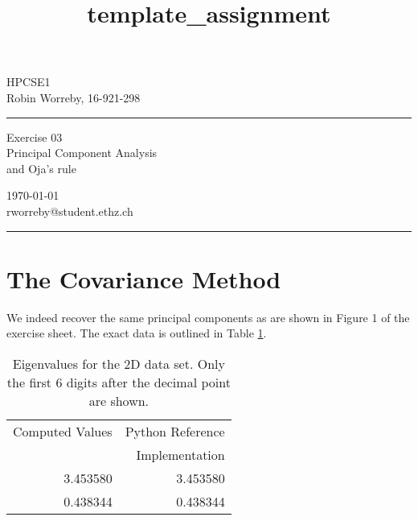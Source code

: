 \documentclass[a4paper,10pt]{article} %
\begin{document}

\title{template_assignment} %
\fancyhead[C]{}
\begin{minipage}{0.295\textwidth} %
\raggedright
HPCSE1\\ %
\footnotesize %
Robin Worreby, 16-921-298 %
\medskip\hrule
\end{minipage}
\begin{minipage}{0.4\textwidth} %
\centering 
\large %
Exercise 03\\ %
\normalsize %
Principal Component Analysis\\ and Oja’s rule\\ %
\end{minipage}
\begin{minipage}{0.295\textwidth} %
\raggedleft
\today\\ %
\footnotesize %
rworreby@student.ethz.ch%
\medskip\hrule
\end{minipage}


\setcounter{section}{0}

\section{The Covariance Method}
We indeed recover the same principal components as are shown in Figure 1 of the exercise sheet. The exact data is outlined in Table \ref{table:eigenvalues}.

\begin{table}[h!]
 \centering
{\begin{tabular}{r r}
    \toprule
    Computed Values & Python Reference \\
    & Implementation \\
    \midrule
    3.453580 & 3.453580 \\
    0.438344 & 0.438344 \\
    \bottomrule
\end{tabular}}
{\caption{Eigenvalues for the 2D data set. Only the first 6 digits after the decimal point are shown.}
\label{table:eigenvalues}}
\end{table}
\end{document}

